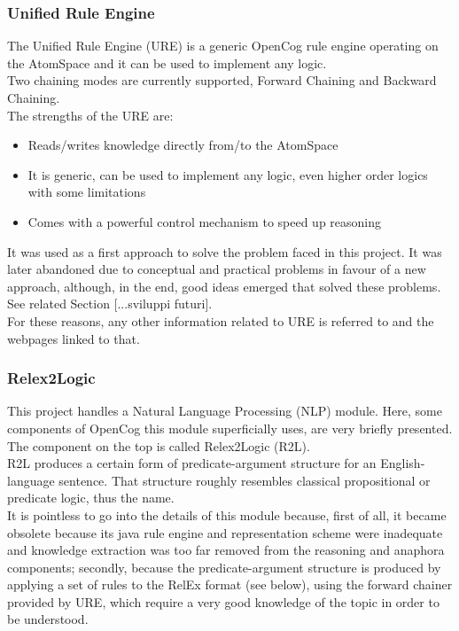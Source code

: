 \subsubsection{Unified Rule Engine}\label{sec:ure}

The Unified Rule Engine (URE) is a generic OpenCog rule engine operating on the AtomSpace and it can be used to implement any logic. \\
Two chaining modes are currently supported, Forward Chaining and Backward Chaining. \\
The strengths of the URE are:
\begin{itemize}
	\item Reads/writes knowledge directly from/to the AtomSpace
	\item It is generic, can be used to implement any logic, even higher order logics with some limitations
	\item Comes with a powerful control mechanism to speed up reasoning
\end{itemize}

It was used as a first approach to solve the problem faced in this project. It was later abandoned due to conceptual and practical problems in favour of a new approach, although, in the end, good ideas emerged that solved these problems. See related Section [...sviluppi futuri]. \\
For these reasons, any other information related to URE is referred to \cite{geisweiller_2019} and the webpages linked to that.
\subsubsection{Relex2Logic}\label{sec:r2l}

This project handles a Natural Language Processing (NLP) module. Here, some components of OpenCog this module superficially uses, are very briefly presented. \\
The component on the top is called Relex2Logic (R2L). \\
R2L produces a certain form of predicate-argument structure for an English-language sentence. That structure roughly resembles classical propositional or predicate logic, thus the name. \\
It is pointless to go into the details of this module because, first of all, it became obsolete because its java rule engine and representation scheme were inadequate and knowledge extraction was too far removed from the reasoning and anaphora components; secondly, because the predicate-argument structure is produced by applying a set of rules to the RelEx format (see below), using the forward chainer provided by URE, which require a very good knowledge of the topic in order to be understood. \\

